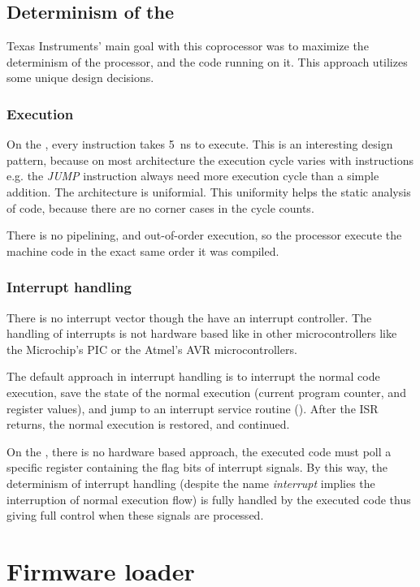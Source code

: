 \subsection{Determinism of the \pru}

Texas Instruments' main goal with this coprocessor was to maximize the determinism of the processor, and the code running on it. This approach utilizes some unique design decisions.

\subsubsection{Execution}

On the \pru, every instruction takes \SI{5}{\nano\second} to execute. This is an interesting design pattern, because on most architecture the execution cycle varies with instructions e.g. the \emph{JUMP} instruction always need more execution cycle than a simple addition. The \pru architecture is uniformial. This uniformity helps the static analysis of code, because there are no corner cases in the cycle counts.

There is no pipelining, and out-of-order execution, so the processor execute the machine code in the exact same order it was compiled.

\subsubsection{Interrupt handling}

There is no interrupt vector though the \pruss have an interrupt controller. The handling of interrupts is not hardware based like in other microcontrollers like the Microchip's PIC or the Atmel's AVR microcontrollers.

The default approach in interrupt handling is to interrupt the normal code execution, save the state of the normal execution (current program counter, and register values), and jump to an interrupt service routine (). After the ISR returns, the normal execution is restored, and continued.

On the \pru, there is no hardware based approach, the executed code must poll a specific register containing the flag bits of interrupt signals. By this way, the determinism of interrupt handling (despite the name \emph{interrupt} implies the interruption of normal execution flow) is fully handled by the executed code thus giving full control when these signals are processed.

\section{Firmware loader}

